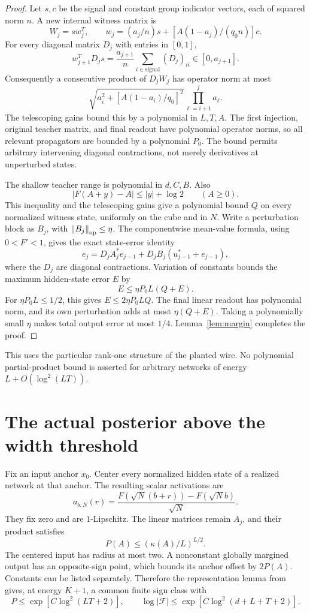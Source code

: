 \documentclass[11pt]{article}
\theoremstyle{remark}\newtheorem{remark}[theorem]{Remark}
\newcommand{\norm}[1]{\left\lVert #1\right\rVert}
\begin{document}
\begin{proof}
Let $s,c$ be the signal and constant group indicator vectors, each of
squared norm $n$. A new internal witness matrix is
\[
 W_j=s w_j^T,\qquad
 w_j=(a_j/n)s+[A(1-a_j)/(q_0n)]c.
\]
For every diagonal matrix $D_j$ with entries in $[0,1]$,
\[
 w_{j+1}^TD_js=\frac{a_{j+1}}n\sum_{i\in\mathrm{signal}}(D_j)_{ii}
 \in[0,a_{j+1}].
\]
Consequently a consecutive product of $D_jW_j$ has operator norm at most
\[
 \sqrt{a_i^2+[A(1-a_i)/q_0]^2}\prod_{\ell=i+1}^ja_\ell.
\]
The telescoping gains bound this by a polynomial in $L,T,A$.
The first injection, original teacher matrix, and final readout have
polynomial operator norms, so all relevant propagators are bounded by a
polynomial $P_0$. The bound permits arbitrary intervening diagonal
contractions, not merely derivatives at unperturbed states.

The shallow teacher range is polynomial in $d,C,B$. Also
\[
 |F(A+y)-A|\le |y|+\log2\qquad(A\ge0).
\]
This inequality and the telescoping gains give a polynomial bound $Q$
on every normalized witness state, uniformly on the cube and in $N$.
Write a perturbation block as $B_j$, with $\norm{B_j}_{\rm op}\le\eta$.
The componentwise mean-value formula, using $0<F'<1$, gives the exact
state-error identity
\[
 e_j=D_jA_j^*e_{j-1}+D_jB_j(u_{j-1}^*+e_{j-1}),
\]
where the $D_j$ are diagonal contractions. Variation of constants bounds
the maximum hidden-state error $E$ by
\[
 E\le\eta P_0L(Q+E).
\]
For $\eta P_0L\le1/2$, this gives $E\le2\eta P_0LQ$.
The final linear readout has polynomial norm, and its own perturbation
adds at most $\eta(Q+E)$. Taking a polynomially small $\eta$ makes total
output error at most $1/4$. Lemma~\ref{lem:margin} completes the proof.
\end{proof}

This uses the particular rank-one structure of the planted wire. No
polynomial partial-product bound is asserted for arbitrary networks of
energy $L+O(\log^2(LT))$.

\section{The actual posterior above the width threshold}

Fix an input anchor $x_0$. Center every normalized hidden state of a
realized network at that anchor. The resulting scalar activations are
\[
 a_{b,N}(r)=\frac{F(\sqrt N(b+r))-F(\sqrt N b)}{\sqrt N}.
\]
They fix zero and are $1$-Lipschitz. The linear matrices remain $A_j$,
and their product satisfies
\[
 P(A)\le(\kappa(A)/L)^{L/2}.
\]
The centered input has radius at most two. A nonconstant globally
margined output has an opposite-sign point, which bounds its anchor
offset by $2P(A)$. Constants can be listed separately. Therefore the
representation lemma from \cite{logistic} gives, at energy $K+1$,
a common finite sign class with
\begin{equation}\label{eq:class}
 P\le\exp[C\log^2(LT+2)],\qquad
 \log|\mathcal F|\le\exp[C\log^2(d+L+T+2)].
\end{equation}
\end{document}

